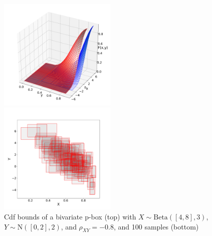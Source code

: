 \documentclass{juliacon}
\begin{document}
\begin{figure}[htp]

  
  \includegraphics[width=0.5\textwidth]{../examples/JuliaCon/fig7/biv_cdf.pdf} 
  
  \includegraphics[width=0.5\textwidth]{../examples/JuliaCon/fig7/samples.pdf}
  

  \caption{Cdf bounds of a bivariate p-box (top) with $X \sim \text{Beta}([4,8], 3)$, $Y \sim \text{N}([0,2], 2)$, and $\rho_{XY} = -0.8$, and 100 samples (bottom)}
  \label{fig:figure7}
  
\end{figure}
\end{document}
